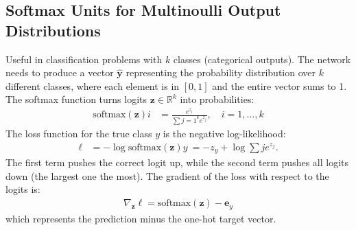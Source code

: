 \subsection{Softmax Units for Multinoulli Output Distributions}
Useful in classification problems with $k$ classes (categorical outputs). The network needs to produce
a vector $\mathbf{\hat{y}}$ representing the probability distribution over $k$ different classes, 
where each element is in $[0,1]$ and the entire vector sums to 1. The softmax function turns logits 
$\mathbf{z} \in \mathbb{R}^k$ into probabilities:
\begin{align*}
\text{softmax}(\mathbf{z})i &= \frac{e^{z_i}}{\sum{j=1}^k e^{z_j}}, \quad i = 1, \ldots, k
\end{align*}
The loss function for the true class $y$ is the negative log-likelihood:
\begin{align*}
\ell &= -\log \text{softmax}(\mathbf{z})y \ = -z_y + \log \sum{j} e^{z_j}.
\end{align*}
The first term pushes the correct logit up, while the second term pushes all logits down 
(the largest one the most). The gradient of the loss with respect to the logits is:
\begin{align*}
\nabla_{\mathbf{z}}\ell = \text{softmax}(\mathbf{z}) - \mathbf{e}_y
\end{align*}
which represents the prediction minus the one-hot target vector.
\begin{figure}[H]
\end{figure}


